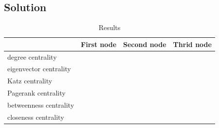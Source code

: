 \documentclass{article}
\begin{document}
\subsection*{Solution}
\begin{table}[h]
        \caption{Results}
        \begin{center}
            \begin{tabular}{llll}
                \hline
                & First node& Second node& Thrid node\\
                \hline
                degree centrality&&&\\
                eigenvector centrality&&&\\
                Katz centrality&&&\\
                Pagerank centrality&&&\\
                betweenness centrality&&&\\
                closeness centrality&&&\\
                \hline
            \end{tabular}
        \end{center}
    \end{table}


\clearpage %
\end{document}

